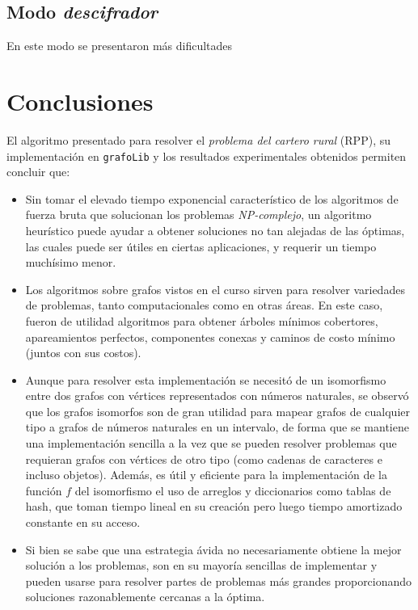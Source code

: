 \documentclass[11pt]{article}
\begin{document}
\subsection{Modo \emph{descifrador}}

En este modo se presentaron más dificultades

\section{Conclusiones}

El algoritmo presentado para resolver el \emph{problema del cartero rural} (RPP),
su implementación en \texttt{grafoLib} y los resultados 
experimentales obtenidos permiten concluir que:

\begin{itemize}
   \item Sin tomar el elevado tiempo exponencial característico de
   los algoritmos de fuerza bruta que solucionan los problemas
   \emph{NP-complejo}, un algoritmo heurístico puede ayudar a obtener
   soluciones no tan alejadas de las óptimas, las cuales puede ser
   útiles en ciertas aplicaciones, y requerir un tiempo muchísimo
   menor.

   \item Los algoritmos sobre grafos vistos en el curso sirven
   para resolver variedades de problemas, tanto computacionales
   como en otras áreas. En este caso, fueron de utilidad algoritmos
   para obtener árboles mínimos cobertores, apareamientos perfectos,
   componentes conexas y caminos de costo mínimo (juntos con sus
   costos).

   \item Aunque para resolver esta implementación se necesitó de 
   un isomorfismo entre dos grafos con vértices representados con 
   números naturales, se observó que los grafos isomorfos son de
   gran utilidad para mapear grafos de cualquier tipo a grafos de
   números naturales en un intervalo, de forma que se mantiene una
   implementación sencilla a la vez que se pueden resolver problemas
   que requieran grafos con vértices de otro tipo (como cadenas de
   caracteres e incluso objetos). Además, es útil y eficiente para
   la implementación de la función $f$ del isomorfismo el uso de arreglos
   y diccionarios como tablas de hash, que toman tiempo lineal en su
   creación pero luego tiempo amortizado constante en su acceso.

   \item Si bien se sabe que una estrategia ávida no necesariamente
   obtiene la mejor solución a los problemas, son en su mayoría
   sencillas de implementar y pueden usarse para resolver partes
   de problemas más grandes proporcionando soluciones razonablemente
   cercanas a la óptima.


\end{itemize}
\end{document}
